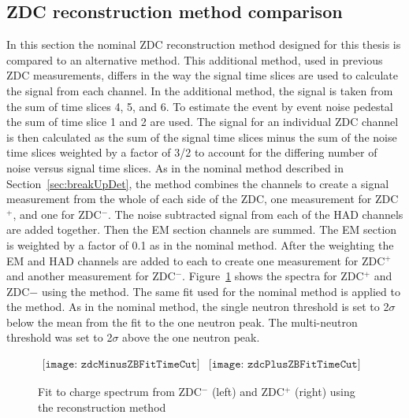     \subsection{\label{sec:zdcCompare}ZDC reconstruction method comparison}
      In this section the nominal ZDC reconstruction method designed for this
        thesis is compared to an alternative \DIFdelbegin {}\DIFdelend method.
      This additional method, used in previous ZDC measurements, differs 
        in the way the signal time slices are used to calculate the signal from
        each channel.
      In the additional \DIFdelbegin {}\DIFdelend \DIFaddbegin {}\DIFaddend method, the signal is taken from the sum of 
        time slices 4, 5, and 6.
      To estimate the event by event noise pedestal the sum of time slice 
        1 and 2 are used. 
      The signal for an individual ZDC channel is then calculated as the 
        sum of the signal time slices minus the sum of the noise time slices
        weighted by a factor of 3/2 to account for the differing number of 
        noise versus signal time slices.
      As in the nominal method described in Section~\ref{sec:breakUpDet}, 
        the \DIFdelbegin {}\DIFdelend \DIFaddbegin {}\DIFaddend method combines the channels to create a signal 
        measurement from the whole of each side of the ZDC, one
        measurement for ZDC$^{+}$, and one for ZDC$^{-}$.
      The noise subtracted signal from each of the HAD channels are added 
        together.
      Then the EM section channels are summed. 
      The EM section is weighted by a factor of 0.1 as in the nominal method. 
      After the weighting the EM and HAD channels are added to each to create
        one measurement for ZDC$^{+}$ and another measurement for ZDC$^{-}$.
      Figure~\ref{fig:zdcM1Fit} shows the spectra for ZDC$^{+}$ and ZDC${-}$ 
        using the \DIFdelbegin {}\DIFdelend \DIFaddbegin {}\DIFaddend method. 
      The same fit used for the nominal method is applied to the \DIFdelbegin {}\DIFdelend \DIFaddbegin {}\DIFaddend method. 
      As in the nominal method, the single neutron threshold is set to 2$\sigma$
        below the mean from the fit to the one neutron peak.
      The multi-neutron threshold was set to 2$\sigma$ above the one neutron
        peak.
      \begin{figure}[!Hhtb]
        \centering
        $ \begin{array}{cc}
          \texttt{[image: zdcMinusZBFitTimeCut]} &
          \texttt{[image: zdcPlusZBFitTimeCut]}
        \end{array} $
        \caption{Fit to charge spectrum from ZDC$^{-}$ (left) and ZDC$^{+}$ 
          (right) using the \DIFdelbeginFL {}\DIFdelendFL \DIFaddbeginFL {}\DIFaddendFL reconstruction method}
        \label{fig:zdcM1Fit}
      \end{figure}

